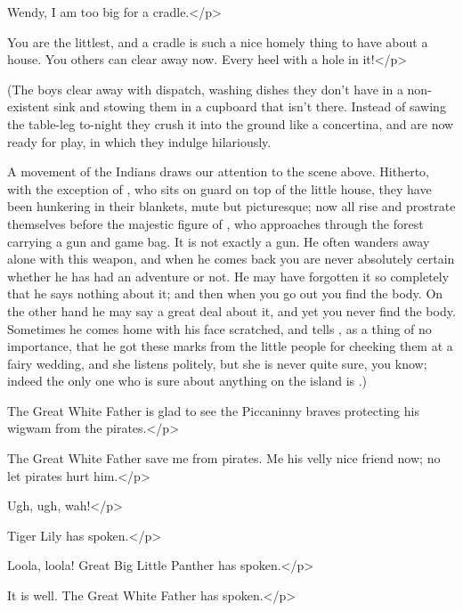 \begin{drama}
\michaelspeaks
Wendy, I am too big for a cradle.</p>

\wendyspeaks
You are the littlest, and a cradle is such a nice homely thing to have about a house.
You others can clear away now.
Every heel with a hole in it!</p>

\begin{stagedir}
(The boys clear away with dispatch,
washing dishes they don't have in a non-existent sink and stowing them in a cupboard that isn't there.
Instead of sawing the table-leg to-night they crush it into the ground like a concertina,
and are now ready for play, in which they indulge hilariously.

A movement of the Indians draws our attention to the scene above.
Hitherto, with the exception of \panther, who sits on guard on top of the little house,
they have been hunkering in their blankets, mute but picturesque;
now all rise and prostrate themselves before the majestic figure of \peter,
who approaches through the forest carrying a gun and game bag.
It is not exactly a gun.
He often wanders away alone with this weapon,
and when he comes back you are never absolutely certain whether he has had an adventure or not.
He may have forgotten it so completely that he says nothing about it;
and then when you go out you find the body.
On the other hand he may say a great deal about it, and yet you never find the body.
Sometimes he comes home with his face scratched,
and tells \wendy, as a thing of no importance,
that he got these marks from the little people for cheeking them at a fairy wedding,
and she listens politely, but she is never quite sure, you know;
indeed the only one who is sure about anything on the island is \peter.)
\end{stagedir}

\peterspeaks
The Great White Father is glad to see the Piccaninny braves protecting his wigwam from the pirates.</p>

\tigerlilyspeaks
The Great White Father save me from pirates.
Me his velly nice friend now;
no let pirates hurt him.</p>

Ugh, ugh, wah!</p>

\tigerlilyspeaks
Tiger Lily has spoken.</p>

\pantherspeaks
Loola, loola!
Great Big Little Panther has spoken.</p>

\peterspeaks
It is well.
The Great White Father has spoken.</p>


\end{drama}
